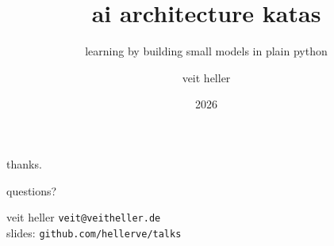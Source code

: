\documentclass[aspectratio=1610,14pt]{beamer}
\title{ai architecture katas}
\subtitle{learning by building small models in plain python}
\author{veit heller}
\institute{cyberwitchery lab}
\date{2026}
\begin{document}
  {
  \begin{frame}[plain]
    \cwlogoright[cwGhost]{0.42\paperheight}%
    \titlepage
  \end{frame}}

  

  {
  \begin{frame}[plain]
    \cwlogoright[cwInk]{0.42\paperheight}%
    \paperheight
    \begin{minipage}{0.62\textwidth}
      {\color{cwInk}thanks.}\par\vskip12pt
      {\cwhanken\large\color{cwTeal}questions?}\par
      \paperheight
      {\cwhanken\color{cwMuted}veit heller \quad \texttt{veit@veitheller.de}}\\[5pt]
      {\cwhanken\color{cwFaint}slides: \texttt{github.com/hellerve/talks}}
    \end{minipage}
  \end{frame}}
\end{document}
